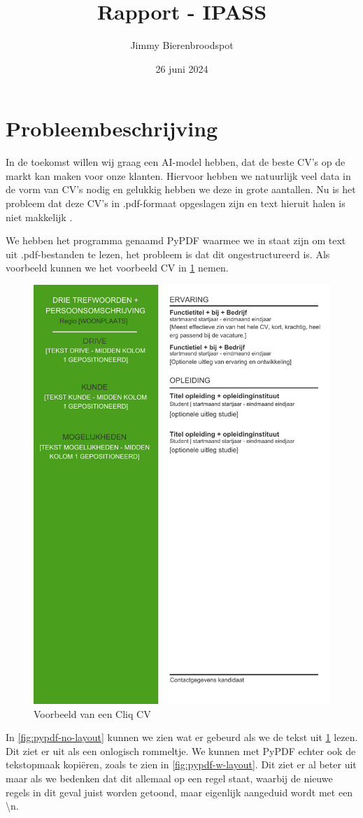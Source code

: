\documentclass{article}
\title{Rapport - IPASS}
\author{Jimmy Bierenbroodspot}
\date{26 juni 2024}
\begin{document}
\begin{titlepage}
    \maketitle
\end{titlepage}

\section{Probleembeschrijving}

In de toekomst willen wij graag een AI-model hebben, dat de beste CV's op de
markt kan maken voor onze klanten. Hiervoor hebben we natuurlijk veel data in de
vorm van CV's nodig en gelukkig hebben we deze in grote aantallen. Nu is het
probleem dat deze CV's in .pdf-formaat opgeslagen zijn en text hieruit halen is
niet makkelijk \cite{timalsina-2024}.

We hebben het programma genaamd PyPDF\cite{unknown-author-2024} waarmee we in
staat zijn om text uit .pdf-bestanden te lezen, het probleem is dat dit
ongestructureerd is. Als voorbeeld kunnen we het voorbeeld CV in \ref{fig:cv-example}
nemen.

\begin{figure}[ht]
    \begin{center}
        \includegraphics[width=0.5\linewidth]{pdf/voorbeeld_aicv_cv.pdf}
    \end{center}
    \caption{Voorbeeld van een Cliq CV}
    \label{fig:cv-example}
\end{figure}

In \ref{fig:pypdf-no-layout} kunnen we zien wat er gebeurd als we de tekst
uit \ref{fig:cv-example} lezen. Dit ziet er uit als een onlogisch rommeltje.
We kunnen met PyPDF echter ook de tekstopmaak kopiëren, zoals te zien in
\ref{fig:pypdf-w-layout}. Dit ziet er al beter uit maar als we bedenken dat
dit allemaal op een regel staat, waarbij de nieuwe regels in dit geval juist
worden getoond, maar eigenlijk aangeduid wordt met een \textbackslash n.
\end{document}
